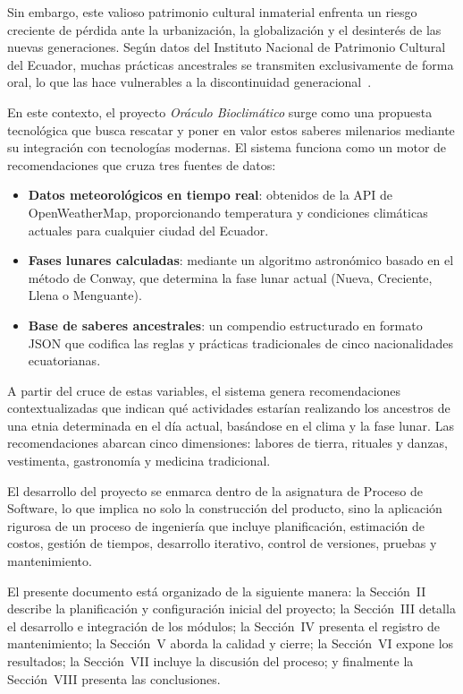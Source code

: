 \documentclass[conference]{IEEEtran}
\begin{document}
Sin embargo, este valioso patrimonio cultural inmaterial enfrenta un riesgo creciente de pérdida ante la urbanización, la globalización y el desinterés de las nuevas generaciones. Según datos del Instituto Nacional de Patrimonio Cultural del Ecuador, muchas prácticas ancestrales se transmiten exclusivamente de forma oral, lo que las hace vulnerables a la discontinuidad generacional~\cite{inpc2019}.

En este contexto, el proyecto \textit{Oráculo Bioclimático} surge como una propuesta tecnológica que busca rescatar y poner en valor estos saberes milenarios mediante su integración con tecnologías modernas. El sistema funciona como un motor de recomendaciones que cruza tres fuentes de datos:

\begin{itemize}
    \item \textbf{Datos meteorológicos en tiempo real}: obtenidos de la API de OpenWeatherMap, proporcionando temperatura y condiciones climáticas actuales para cualquier ciudad del Ecuador.
    \item \textbf{Fases lunares calculadas}: mediante un algoritmo astronómico basado en el método de Conway, que determina la fase lunar actual (Nueva, Creciente, Llena o Menguante).
    \item \textbf{Base de saberes ancestrales}: un compendio estructurado en formato JSON que codifica las reglas y prácticas tradicionales de cinco nacionalidades ecuatorianas.
\end{itemize}

A partir del cruce de estas variables, el sistema genera recomendaciones contextualizadas que indican qué actividades estarían realizando los ancestros de una etnia determinada en el día actual, basándose en el clima y la fase lunar. Las recomendaciones abarcan cinco dimensiones: labores de tierra, rituales y danzas, vestimenta, gastronomía y medicina tradicional.

El desarrollo del proyecto se enmarca dentro de la asignatura de Proceso de Software, lo que implica no solo la construcción del producto, sino la aplicación rigurosa de un proceso de ingeniería que incluye planificación, estimación de costos, gestión de tiempos, desarrollo iterativo, control de versiones, pruebas y mantenimiento.

El presente documento está organizado de la siguiente manera: la Sección~II describe la planificación y configuración inicial del proyecto; la Sección~III detalla el desarrollo e integración de los módulos; la Sección~IV presenta el registro de mantenimiento; la Sección~V aborda la calidad y cierre; la Sección~VI expone los resultados; la Sección~VII incluye la discusión del proceso; y finalmente la Sección~VIII presenta las conclusiones.
\end{document}
